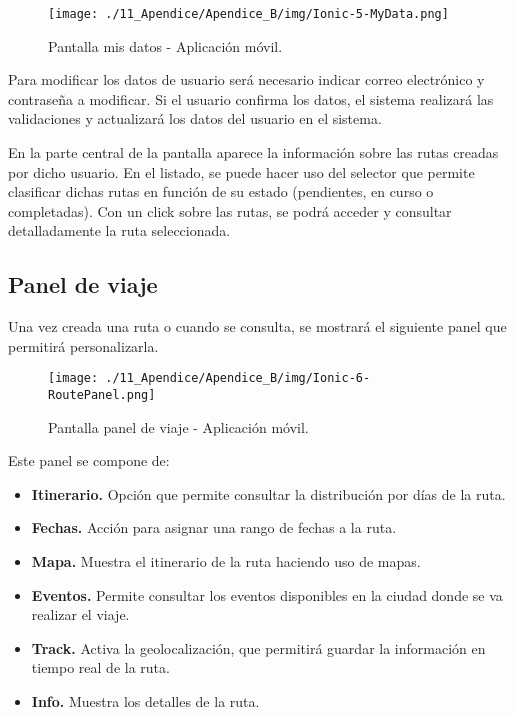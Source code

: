 \begin{figure}[H]
\centering
\texttt{[image: ./11\_Apendice/Apendice\_B/img/Ionic-5-MyData.png]}
\caption{Pantalla mis datos - Aplicación móvil.}
\end{figure}


Para modificar los datos de usuario será necesario indicar correo electrónico y contraseña a modificar. Si el usuario confirma los datos, el sistema realizará las validaciones y actualizará los datos del usuario en el sistema.

En la parte central de la pantalla aparece la información sobre las rutas creadas por dicho usuario. En el listado, se puede hacer uso del selector que permite clasificar dichas rutas en función de su estado (pendientes, en curso o completadas). Con un click sobre las rutas, se podrá acceder y consultar detalladamente la ruta seleccionada.


\newpage
\subsection*{Panel de viaje}
Una vez creada una ruta o cuando se consulta, se mostrará el siguiente panel que permitirá personalizarla.


\begin{figure}[H]
\centering
\texttt{[image: ./11\_Apendice/Apendice\_B/img/Ionic-6-RoutePanel.png]}
\caption{Pantalla panel de viaje - Aplicación móvil.}
\end{figure}

Este panel se compone de:

\begin{itemize}
	\item \textbf{Itinerario. }Opción que permite consultar la distribución por días de la ruta.
	
	\item \textbf{Fechas. }Acción para asignar una rango de fechas a la ruta.
	
	\item \textbf{Mapa. }Muestra el itinerario de la ruta haciendo uso de mapas.
	
	\item \textbf{Eventos. }Permite consultar los eventos disponibles en la ciudad donde se va realizar el viaje. 
	
	\item \textbf{Track. }Activa la geolocalización, que permitirá guardar la información en tiempo real de la ruta.
	
	\item \textbf{Info. }Muestra los detalles de la ruta.
\end{itemize}


